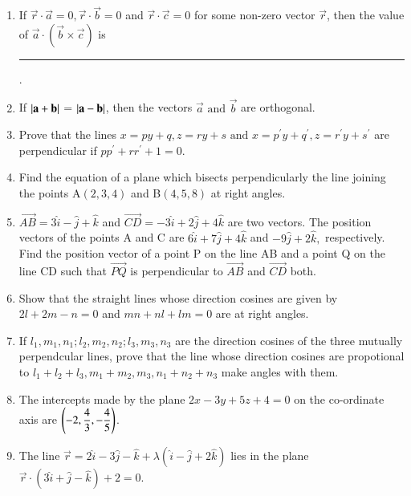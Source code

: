 \begin{enumerate}[label=\thesection.\arabic*,ref=\thesection.\theenumi]
\begin{enumerate}
\end{enumerate}
\item If $\vec{r}\cdot\vec{a}=0, \vec{r}\cdot\vec{b}=0$ and $\vec{r}\cdot\vec{c}=0$ for some non-zero vector $\vec{r}$, then the value of $\vec{a}\cdot(\vec{b}\times\vec{c})$ is \rule{1cm}{0.15mm}.
\item If $\left\vert\mathbf{a}+\mathbf{b}\right\vert$ = $\left\vert\mathbf{a}-\mathbf{b}\right\vert$, then the vectors $\vec{a}$ $\text {and}$ $\vec{b}$ are orthogonal.
\item Prove that the lines $x=py+q , z=ry+s \text{ and } x=p^{\prime}y+q^{\prime}, z=r^{\prime}y+s^{\prime} $ are perpendicular if $pp^{\prime}+rr^{\prime}+1=0$.
\item Find the equation of a plane which  bisects perpendicularly the line joining the points A$(2,3,4)$ and B$(4,5,8)$ at right angles.
\item $\overrightarrow{AB}=3\hat{i}-\hat{j}+\hat{k}$ and $\overrightarrow{CD}=-3\hat{i}+2\hat{j}+4\hat{k}$ are two vectors. The position vectors of the points A and C are $6\hat{i}+7\hat{j}+4\hat{k}$ and $-9\hat{j}+2\hat{k},$ respectively. Find the position vector of a point P on the line AB and a point Q on the line CD such that $\overrightarrow{PQ}$ is perpendicular to $\overrightarrow{AB}$ and $\overrightarrow{CD}$ both.
\item Show that the straight lines whose direction cosines are given by $2l+2m-n=0$ and $mn+nl+lm=0$ are at right angles.
\item If $l_1, m_1, n_1;l_2, m_2, n_2;l_3, m_3, n_3$ are the direction cosines of the three mutually perpendcular lines, prove that the line whose direction cosines are propotional to $l_1+l_2+l_3 , m_1+m_2,m_3, n_1+n_2+n_3$ make angles with them.
\item The intercepts made by the plane $2x-3y+5z+4=0$ on the co-ordinate axis are $\left(-2,\dfrac{4}{3},-\dfrac{4}{5}\right)$.
\item The line $\overrightarrow{r}=2\hat{i}-3\hat{j}-\hat{k}+\lambda(\hat{i}-\hat{j}+2\hat{k})$ lies in the plane $\overrightarrow{r} \cdot (3\hat{i}+\hat{j}-\hat{k})+2=0$.
\end{enumerate}
